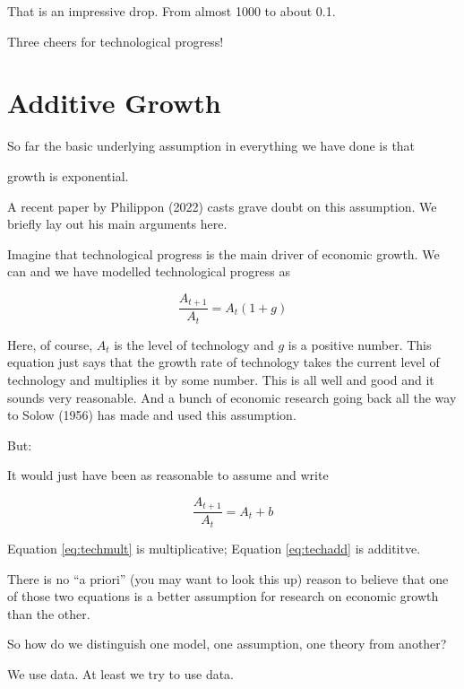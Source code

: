 \documentclass[
]{book}
\begin{document}
That is an impressive drop. From almost 1000 to about 0.1.

Three cheers for technological progress!

\hypertarget{additive-growth}{%
\section{Additive Growth}\label{additive-growth}}

So far the basic underlying assumption in everything we have done is that

\begin{center}
growth is exponential.

\end{center}

A recent paper by Philippon (2022) casts grave doubt on this assumption. We briefly lay out his main arguments here.

Imagine that technological progress is the main driver of economic growth. We can and we have modelled technological progress as

\begin{equation}
\frac{A_{t+1}}{A_t}=A_t(1+g)
\label{eq:techmult}
\end{equation}

Here, of course, \(A_t\) is the level of technology and \(g\) is a positive number. This equation just says that the growth rate of technology takes the current level of technology and multiplies it by some number. This is all well and good and it sounds very reasonable. And a bunch of economic research going back all the way to Solow (1956) has made and used this assumption.

But:

It would just have been as reasonable to assume and write

\begin{equation}
\frac{A_{t+1}}{A_t}=A_t + b
\label{eq:techadd}
\end{equation}

Equation \eqref{eq:techmult} is multiplicative; Equation \eqref{eq:techadd} is addititve.

There is no ``a priori'' (you may want to look this up) reason to believe that one of those two equations is a better assumption for research on economic growth than the other.

So how do we distinguish one model, one assumption, one theory from another?

We use data. At least we try to use data.
\end{document}
